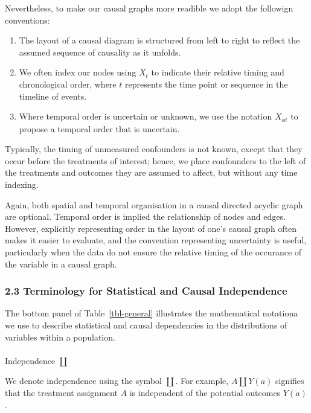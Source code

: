 \documentclass[
  single column]{article}
\makeatletter
\let\oldparagraph\paragraph
\renewcommand{\paragraph}{
    \@ifstar
      \xxxParagraphStar
      \xxxParagraphNoStar
  }
\newcommand{\xxxParagraphStar}[1]{\oldparagraph*{#1}\mbox{}}
\newcommand{\xxxParagraphNoStar}[1]{\oldparagraph{#1}\mbox{}}
\providecommand{\tightlist}{%
  \setlength{\itemsep}{0pt}\setlength{\parskip}{0pt}}\usepackage{longtable,booktabs,array}
\makeatother
\begin{document}
Nevertheless, to make our causal graphs more readible we adopt the
followign conventions:

\begin{enumerate}
\def\labelenumi{\arabic{enumi}.}
\tightlist
\item
  The layout of a causal diagram is structured from left to right to
  reflect the assumed sequence of causality as it unfolds.
\item
  We often index our nodes using \(X_t\) to indicate their relative
  timing and chronological order, where \(t\) represents the time point
  or sequence in the timeline of events.
\item
  Where temporal order is uncertain or unknown, we use the notation
  \(X_{\phi t}\) to propose a temporal order that is uncertain.
\end{enumerate}

Typically, the timing of unmeasured confounders is not known, except
that they occur before the treatments of interest; hence, we place
confounders to the left of the treatments and outcomes they are assumed
to affect, but without any time indexing.

Again, both spatial and temporal organisation in a causal directed
acyclic graph are optional. Temporal order is implied the relationship
of nodes and edges. However, explicitly representing order in the layout
of one's causal graph often makes it easier to evaluate, and the
convention representing uncertainty is useful, particularly when the
data do not ensure the relative timing of the occurance of the variable
in a causal graph.

\subsubsection{2.3 Terminology for Statistical and Causal
Independence}\label{terminology-for-statistical-and-causal-independence}

The bottom panel of Table~\ref{tbl-general} illustrates the mathematical
notationa we use to describe statistical and causal dependencies in the
distributions of variables within a population.

\paragraph{\texorpdfstring{Independence
\(\coprod\)}{Independence \textbackslash coprod}}\label{independence-coprod}

We denote independence using the symbol \(\coprod\). For example,
\(A \coprod Y(a)\) signifies that the treatment assignment \(A\) is
independent of the potential outcomes \(Y(a)\).
\end{document}
